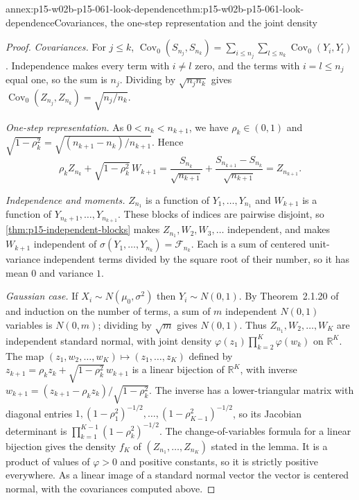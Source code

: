 \begin{annexitem}{annex:p15-w02b-p15-061-look-dependence}{thm:p15-w02b-p15-061-look-dependence}{Covariances, the one-step representation and the joint density}
\begin{proof}
\emph{Covariances.} For \(j\leq k\),
\(\operatorname{Cov}_0(S_{n_j},S_{n_k})=\sum_{i\leq n_j}\sum_{l\leq n_k}
\operatorname{Cov}_0(Y_i,Y_l)\). Independence makes every term with
\(i\neq l\) zero, and the terms with \(i=l\leq n_j\) equal one, so the sum
is \(n_j\). Dividing by \(\sqrt{n_jn_k}\) gives
\(\operatorname{Cov}_0(Z_{n_j},Z_{n_k})=\sqrt{n_j/n_k}\).

\emph{One-step representation.} As \(0<n_k<n_{k+1}\), we have
\(\rho_k\in(0,1)\) and \(\sqrt{1-\rho_k^2}=
\sqrt{(n_{k+1}-n_k)/n_{k+1}}\). Hence
\[
 \rho_kZ_{n_k}+\sqrt{1-\rho_k^2}\,W_{k+1}
 =\frac{S_{n_k}}{\sqrt{n_{k+1}}}
 +\frac{S_{n_{k+1}}-S_{n_k}}{\sqrt{n_{k+1}}}
 =Z_{n_{k+1}} .
\]

\emph{Independence and moments.} \(Z_{n_1}\) is a function of
\(Y_1,\ldots,Y_{n_1}\) and \(W_{k+1}\) is a function of
\(Y_{n_k+1},\ldots,Y_{n_{k+1}}\). These blocks of indices are pairwise
disjoint, so \cref{thm:p15-independent-blocks} makes
\(Z_{n_1},W_2,W_3,\ldots\) independent, and makes \(W_{k+1}\) independent
of \(\sigma(Y_1,\ldots,Y_{n_k})=\mathcal F_{n_k}\). Each is a sum of
centered unit-variance independent terms divided by the square root of
their number, so it has mean \(0\) and variance \(1\).

\emph{Gaussian case.} If \(X_i\sim N(\mu_0,\sigma^2)\) then
\(Y_i\sim N(0,1)\). By Theorem~2.1.20 of
\cite[p.~52]{DurrettPTEAuthor2019} and induction on the number of
terms, a sum of \(m\) independent \(N(0,1)\) variables is \(N(0,m)\);
dividing by \(\sqrt m\) gives \(N(0,1)\). Thus \(Z_{n_1},W_2,\ldots,W_K\)
are independent standard normal, with joint density
\(\varphi(z_1)\prod_{k=2}^{K}\varphi(w_k)\) on \(\mathbb R^K\).
The map \((z_1,w_2,\ldots,w_K)\mapsto(z_1,\ldots,z_K)\) defined by
\(z_{k+1}=\rho_kz_k+\sqrt{1-\rho_k^2}\,w_{k+1}\) is a linear bijection of
\(\mathbb R^K\), with inverse
\(w_{k+1}=(z_{k+1}-\rho_kz_k)/\sqrt{1-\rho_k^2}\). The inverse has a
lower-triangular matrix with diagonal entries
\(1,(1-\rho_1^2)^{-1/2},\ldots,(1-\rho_{K-1}^2)^{-1/2}\), so its
Jacobian determinant is \(\prod_{k=1}^{K-1}(1-\rho_k^2)^{-1/2}\).
The change-of-variables formula for a linear bijection gives the density
\(f_K\) of \((Z_{n_1},\ldots,Z_{n_K})\) stated in the lemma. It is a
product of values of \(\varphi>0\) and positive constants, so it is
strictly positive everywhere. As a linear image of a standard normal
vector the vector is centered normal, with the covariances computed
above.
\end{proof}
\end{annexitem}

